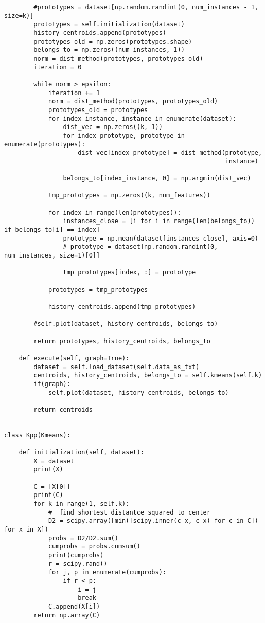 \begin{verbatim}
        #prototypes = dataset[np.random.randint(0, num_instances - 1, size=k)]
        prototypes = self.initialization(dataset)
        history_centroids.append(prototypes)
        prototypes_old = np.zeros(prototypes.shape)
        belongs_to = np.zeros((num_instances, 1))
        norm = dist_method(prototypes, prototypes_old)
        iteration = 0

        while norm > epsilon:
            iteration += 1
            norm = dist_method(prototypes, prototypes_old)
            prototypes_old = prototypes
            for index_instance, instance in enumerate(dataset):
                dist_vec = np.zeros((k, 1))
                for index_prototype, prototype in enumerate(prototypes):
                    dist_vec[index_prototype] = dist_method(prototype,
                                                            instance)

                belongs_to[index_instance, 0] = np.argmin(dist_vec)

            tmp_prototypes = np.zeros((k, num_features))

            for index in range(len(prototypes)):
                instances_close = [i for i in range(len(belongs_to)) if belongs_to[i] == index]
                prototype = np.mean(dataset[instances_close], axis=0)
                # prototype = dataset[np.random.randint(0, num_instances, size=1)[0]]

                tmp_prototypes[index, :] = prototype

            prototypes = tmp_prototypes

            history_centroids.append(tmp_prototypes)

        #self.plot(dataset, history_centroids, belongs_to)

        return prototypes, history_centroids, belongs_to

    def execute(self, graph=True):
        dataset = self.load_dataset(self.data_as_txt)
        centroids, history_centroids, belongs_to = self.kmeans(self.k)
        if(graph):
            self.plot(dataset, history_centroids, belongs_to)

        return centroids


class Kpp(Kmeans):

    def initialization(self, dataset):
        X = dataset
        print(X)

        C = [X[0]]
        print(C)
        for k in range(1, self.k):
            #  find shortest distantce squared to center
            D2 = scipy.array([min([scipy.inner(c-x, c-x) for c in C]) for x in X])
            probs = D2/D2.sum()
            cumprobs = probs.cumsum()
            print(cumprobs)
            r = scipy.rand()
            for j, p in enumerate(cumprobs):
                if r < p:
                    i = j
                    break
            C.append(X[i])
        return np.array(C)


\end{verbatim}
